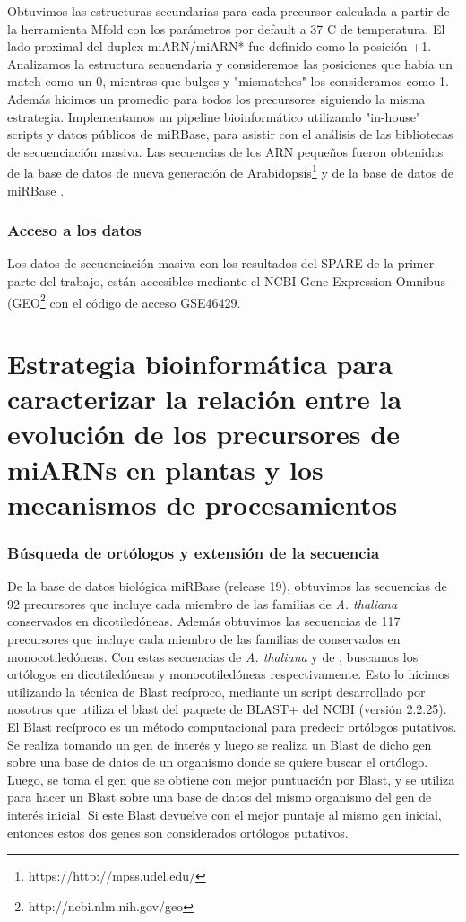 Obtuvimos las estructuras secundarias para cada precursor calculada a partir de la herramienta Mfold \citep{pmid12824337} con los parámetros por default a 37 \degree C de temperatura.
El lado proximal del duplex miARN/miARN* fue definido como la posición +1.
Analizamos la estructura secuendaria y consideremos las posiciones que había un match como un 0, mientras que bulges y "mismatches" los consideramos como 1.
Además hicimos un promedio para todos los precursores siguiendo la misma estrategia.
Implementamos un pipeline bioinformático utilizando "in-house" scripts y datos públicos de miRBase, para asistir con el análisis de las bibliotecas de secuenciación masiva.
Las secuencias de los ARN pequeños fueron obtenidas de la base de datos de nueva generación de Arabidopsis\footnote{https://http://mpss.udel.edu/} \citep{pmid25120269} y  de la base de datos de miRBase \citep{Kozomara2014}.

\subsubsection{Acceso a los datos}
Los datos de secuenciación masiva con los resultados del SPARE de la primer parte del trabajo, están accesibles mediante el NCBI Gene Expression Omnibus (GEO\footnote{http://ncbi.nlm.nih.gov/geo} con el código de acceso GSE46429.

\section{Estrategia bioinformática para caracterizar la relación entre la evolución de los precursores de miARNs en plantas y los mecanismos de procesamientos} \label{ref_evolution}

\subsubsection{Búsqueda de ortólogos y extensión de la secuencia}\label{sec:reciprocal_blast}
De la base de datos biológica miRBase (release 19), obtuvimos las secuencias de 92 precursores que incluye cada miembro de las familias de \textit{A. thaliana} conservados en dicotiledóneas.
Además obtuvimos las secuencias de 117 precursores que incluye cada miembro de las familias de  conservados en monocotiledóneas.
Con estas secuencias de \textit{A. thaliana} y de , buscamos los ortólogos en dicotiledóneas y monocotiledóneas respectivamente.
Esto lo hicimos utilizando la técnica de Blast recíproco, mediante un script desarrollado por nosotros que utiliza el blast del paquete de BLAST+ del NCBI (versión 2.2.25).
El Blast recíproco es un método computacional para predecir ortólogos putativos. 
Se realiza tomando un gen de interés y luego se realiza un Blast de dicho gen sobre una base de datos de un organismo donde se quiere buscar el ortólogo.
Luego, se toma el gen que se obtiene con mejor puntuación por Blast, y se utiliza para hacer un Blast sobre una base de datos del mismo organismo del gen de interés inicial.
Si este Blast devuelve con el mejor puntaje al mismo gen inicial, entonces estos dos genes son considerados ortólogos putativos. 

